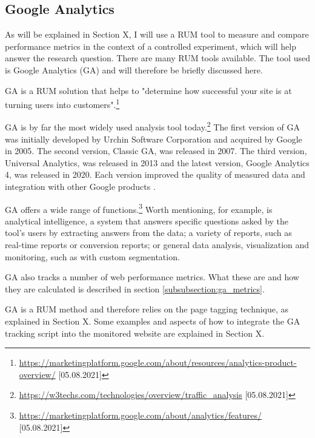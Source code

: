 \subsection{Google Analytics} %
\label{subsection:google_analytics}


As will be explained in Section X, I will use a RUM tool to measure and compare performance metrics in the context of a controlled experiment, which will help answer the research question.
There are many RUM tools available. 
The tool used is Google Analytics (GA) and will therefore be briefly discussed here.


GA is a RUM solution that helps to "determine how successful your site is at turning users into customers".\footnote{\url{https://marketingplatform.google.com/about/resources/analytics-product-overview/} [05.08.2021]}


GA is by far the most widely used analysis tool today.\footnote{\url{https://w3techs.com/technologies/overview/traffic_analysis} [05.08.2021]}
The first version of GA was initially developed by Urchin Software Corporation and acquired by Google in 2005.
The second version, Classic GA, was released in 2007.
The third version, Universal Analytics, was released in 2013 and the latest version, Google Analytics 4, was released in 2020.
Each version improved the quality of measured data and integration with other Google products \cite{2021Franco}.


GA offers a wide range of functions.\footnote{\url{https://marketingplatform.google.com/about/analytics/features/} [05.08.2021]}
Worth mentioning, for example, is analytical intelligence, a system that answers specific questions asked by the tool's users by extracting answers from the data;
a variety of reports, such as real-time reports or conversion reports;
or general data analysis, visualization and monitoring, such as with custom segmentation.

GA also tracks a number of web performance metrics.
What these are and how they are calculated is described in section \ref{subsubsection:ga_metrics}.


GA is a RUM method and therefore relies on the page tagging technique, as explained in Section X.
Some examples and aspects of how to integrate the GA tracking script into the monitored website are explained in Section X.

